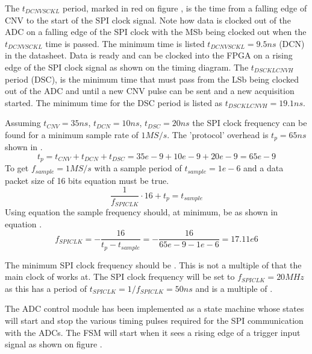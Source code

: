 The $t_{DCNVSCKL}$ period, marked in red on figure , is the time from a falling edge of CNV to the start of the SPI clock signal. Note how data is clocked out of the ADC on a falling edge of the SPI clock with the MSb being clocked out when the $t_{DCNVSCKL}$ time is passed. The minimum time is listed $t_{DCNVSCKL} = 9.5 ns$ (DCN) in the datasheet. Data is ready and can be clocked into the FPGA on a rising edge of the SPI clock signal as shown on the timing diagram. The $t_{DSCKLCNVH}$ period (DSC), is the minimum time that must pass from the LSb being clocked out of the ADC and until a new CNV pulse can be sent and a new acquisition started. The minimum time for the DSC period is listed as $t_{DSCKLCNVH} = 19.1 ns$.

Assuming $t_{CNV} = 35 ns$, $t_{DCN} = 10 ns$, $t_{DSC} = 20ns$ the SPI clock frequency can be found for a minimum sample rate of $1 MS/s$. The 'protocol' overhead is $t_p = 65 ns$ shown in .
\begin{equation}\label{eq:7_2_8_ProtocolOverhead}
        t_{p} = t_{CNV} + t_{DCN} + t_{DSC} = 35e-9 + 10 e-9 + 20 e-9 = 65 e-9
\end{equation}
To get $f_{sample} = 1 MS/s$ with a sample period of $t_{sample} = 1e-6$ and a data packet size of 16 bits equation  must be true.
\begin{equation}\label{eq:7_2_8_SampleFrq}
   \frac{1}{f_{SPICLK}} \cdot 16 + t_p = t_{sample}
\end{equation}
Using equation  the sample frequency should, at minimum, be  as shown in equation .
\begin{equation}\label{eq:7_2_8_SampleFrq2}
    f_{SPICLK} = -\frac{16}{t_{p} - t_{sample}} = -\frac{16}{65e-9 - 1e-6} = 17.11e6
 \end{equation}

The minimum SPI clock frequency should be . This is not a multiple of  that the main clock of  works at. The SPI clock frequency will be set to $f_{SPICLK} = 20 MHz$ as this has a period of $t_{SPICLK} = 1/f_{SPICLK} = 50 ns$ and is a multiple of .

 The ADC control module has been implemented as a state machine whose states will start and stop the various timing pulses required for the SPI communication with the ADCs. The FSM will start when it sees a rising edge of a trigger input signal as shown on figure .

